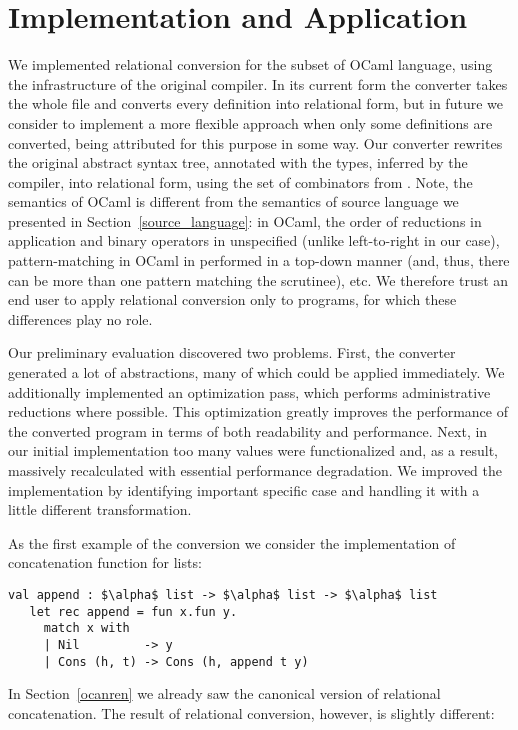 \section{Implementation and Application}
\label{evaluation}

We implemented relational conversion for the subset of OCaml language, using the infrastructure of the 
original compiler. In its current form the converter takes the whole file and converts every definition into relational form, 
but in future we consider to implement a more flexible approach when only some definitions are converted, being attributed
for this purpose in some way. Our converter rewrites the original abstract syntax tree, annotated with the types, inferred by the compiler, 
into relational form, using the set of combinators from \ocanren. Note, the semantics of OCaml is different from the 
semantics of source language we presented in Section~\ref{source_language}: in OCaml, the order of reductions in
application and binary operators in unspecified (unlike left-to-right in our case), pattern-matching in
OCaml in performed in a top-down manner (and, thus, there can be more than one pattern matching the scrutinee), etc. We
therefore trust an end user to apply relational conversion only to programs, for which these differences play
no role.

Our preliminary evaluation discovered two problems. First, the converter generated a lot of abstractions, 
many of which could be applied immediately. We additionally implemented an optimization pass, which performs 
administrative reductions where possible. This optimization greatly improves the performance of the converted 
program in terms of both readability and performance. Next, in our initial implementation too many values were
functionalized and, as a result, massively recalculated with essential performance degradation. We improved
the implementation by identifying important specific case and handling it with a little different 
transformation.

As the first example of the conversion we consider the implementation of concatenation function for lists:

\begin{lstlisting}[basicstyle=\small]
   val append : $\alpha$ list -> $\alpha$ list -> $\alpha$ list
   let rec append = fun x.fun y.
     match x with
     | Nil         -> y
     | Cons (h, t) -> Cons (h, append t y)
\end{lstlisting}

In Section~\ref{ocanren} we already saw the canonical version of relational concatenation. The result of relational conversion, however,
is slightly different:

